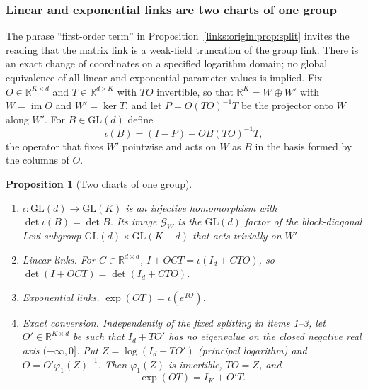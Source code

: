 \documentclass[11pt]{article}
\newtheorem{proposition}[theorem]{Proposition}
\theoremstyle{definition}
\theoremstyle{remark}
\providecommand{\GL}{\mathrm{GL}}
\providecommand{\im}{\operatorname{im}}
\begin{document}
\subsubsection{Linear and exponential links are two charts of one group}
\label{links:origin:sec:charts}

The phrase ``first-order term'' in Proposition~\ref{links:origin:prop:split} invites the reading that the matrix link is a weak-field truncation of the group link. There is an exact change of coordinates on a specified logarithm domain; no global equivalence of all linear and exponential parameter values is implied. Fix $O\in\mathbb R^{K\times d}$ and $T\in\mathbb R^{d\times K}$ with $TO$ invertible, so that $\mathbb R^K=W\oplus W'$ with $W=\im O$ and $W'=\ker T$, and let $P=O(TO)^{-1}T$ be the projector onto $W$ along $W'$. For $B\in\GL(d)$ define
\begin{equation}
\iota(B)=(I-P)+OB(TO)^{-1}T,
\label{links:origin:eq:embed}
\end{equation}
the operator that fixes $W'$ pointwise and acts on $W$ as $B$ in the basis formed by the columns of $O$.

\begin{proposition}[Two charts of one group]
\label{links:origin:prop:charts}
\begin{enumerate}
\item $\iota:\GL(d)\to\GL(K)$ is an injective homomorphism with $\det\iota(B)=\det B$. Its image $\mathcal G_W$ is the $\GL(d)$ factor of the block-diagonal Levi subgroup $\GL(d)\times\GL(K-d)$ that acts trivially on $W'$.
\item \emph{Linear links.} For $C\in\mathbb R^{d\times d}$, $I+OCT=\iota(I_d+CTO)$, so $\det(I+OCT)=\det(I_d+CTO)$.
\item \emph{Exponential links.} $\exp(OT)=\iota(e^{TO})$.
\item \emph{Exact conversion.} Independently of the fixed splitting in items 1--3, let $O'\in\mathbb R^{K\times d}$ be such that $I_d+TO'$ has no eigenvalue on the closed negative real axis $(-\infty,0]$. Put $Z=\log(I_d+TO')$ (principal logarithm) and $O=O'\varphi_1(Z)^{-1}$. Then $\varphi_1(Z)$ is invertible, $TO=Z$, and
\begin{equation}
\exp(OT)=I_K+O'T.
\label{links:origin:eq:conversion}
\end{equation}
\end{enumerate}
\end{proposition}
\end{document}
